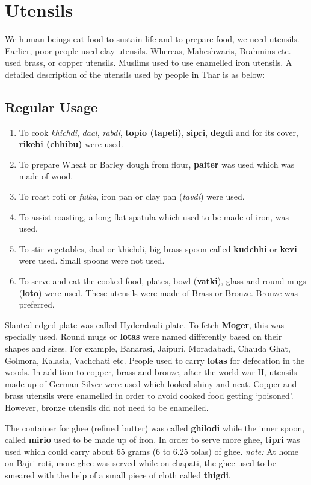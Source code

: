 \section{Utensils}
We human beings eat food to sustain life and to prepare food, we need utensils.
Earlier, poor people used clay utensils. Whereas, Maheshwaris, Brahmins etc.
used brass, or copper utensils. Muslims used to use enamelled iron utensils.
A detailed description of the utensils used by people in Thar is as below:
\subsection{Regular Usage}
\begin{enumerate}
\item To cook \textit{khichdi}, \textit{daal}, \textit{rabdi}, \textbf{topio
(tapeli)}, \textbf{sipri}, \textbf{degdi} and for its cover,
\textbf{rikebi (chhibu)} were used.
\item To prepare Wheat or Barley dough from flour, \textbf{paiter} was used
which was made of wood.
\item To roast roti or \textit{fulka}, iron pan or clay pan (\textit{tavdi})
were used.
\item To assist roasting, a long flat spatula which used to be made of iron, was
used.
\item To stir vegetables, daal or khichdi, big brass spoon called \textbf{kudchhi} or
\textbf{kevi} were used. Small spoons were not used.
\item To serve and eat the cooked food, plates, bowl (\textbf{vatki}), glass and
round mugs (\textbf{loto}) were used. These utensils were made of Brass or
Bronze. Bronze was preferred.
\end{enumerate}
Slanted edged plate was called Hyderabadi plate. To fetch \textbf{Moger}, this
was specially used. Round mugs or \textbf{lotas} were named differently based on
their shapes and sizes. For example, Banarasi, Jaipuri, Moradabadi, Chauda Ghat,
Golmora, Kalasia, Vachchati etc.
People used to carry \textbf{lotas} for defecation in the woods.
In addition to copper, brass and bronze, after the world-war-II, utensils made
up of German Silver were used which looked shiny and neat. Copper and brass
utensils were enamelled in order to avoid cooked food getting `poisoned'.
However, bronze utensils did not need to be enamelled.

The container for ghee (refined butter) was called \textbf{ghilodi} while the
inner spoon, called \textbf{mirio} used to be made up of iron. In order to serve
more ghee, \textbf{tipri} was used which could carry about 65 grams (6 to 6.25
tolas) of ghee. \emph{note:} At home on Bajri roti, more ghee was served while
on chapati, the ghee used to be smeared with the help of a small piece of cloth
called \textbf{thigdi}.

